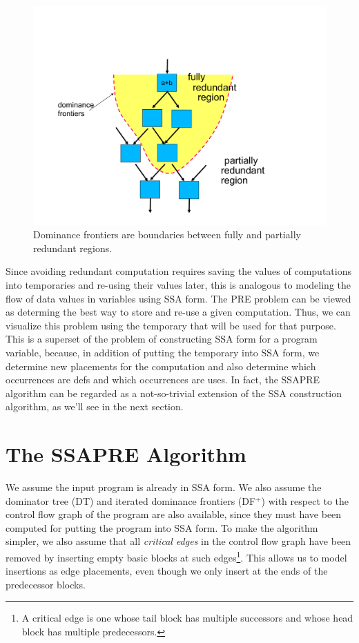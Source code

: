 \begin{figure}
\centering
\includegraphics[scale=0.35]{fig-ssapre-motive.pdf}
\caption{Dominance frontiers are boundaries between fully and partially redundant regions.}
\label{fig: ssapre-motive}
\end{figure}

Since avoiding redundant computation requires saving the values of 
computations into temporaries and re-using their values later, this is
analogous to modeling the flow of data values in variables using SSA form.
The PRE problem can be viewed as determing the best way to store and
re-use a given computation.  Thus, we can visualize this problem using
the temporary that will be used for that purpose.  This is a superset of
the problem of constructing SSA form for a program variable, because,
in addition of putting the temporary into SSA form, 
we determine new placements for the computation and also determine
which occurrences are defs and which occurrences are uses.  In fact, the
SSAPRE algorithm can be regarded as a not-so-trivial extension of the SSA 
construction algorithm, as we'll see in the next section.

\section{The SSAPRE Algorithm}

We assume the input program is already in SSA form.  We also assume 
the dominator tree (DT) and iterated dominance frontiers (DF$^+$) with
respect to the control flow graph of the program are also available, since
they must have been computed for putting the program into SSA form.
To make the algorithm simpler, we also assume that all \emph{critical edges}
in the control flow graph have been removed by inserting empty basic blocks
at such edges\footnote{A critical edge is one whose tail block has multiple
successors and whose head block has multiple predecessors.}\cite{Rosen88}.
This allows us to model insertions as edge placements, even though we only
insert at the ends of the predecessor blocks.

